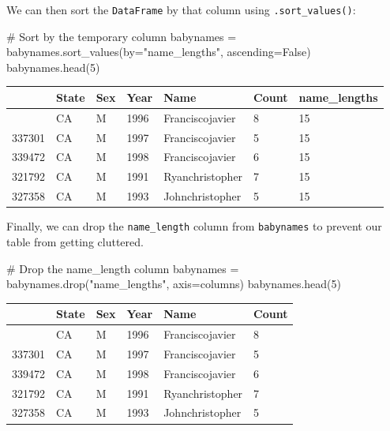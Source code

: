 \documentclass[
  letterpaper,
  DIV=11,
  numbers=noendperiod]{scrreprt}
\newenvironment{Shaded}{\begin{snugshade}}{\end{snugshade}}
\newcommand{\CommentTok}[1]{\textcolor[rgb]{0.37,0.37,0.37}{#1}}
\newcommand{\DecValTok}[1]{\textcolor[rgb]{0.68,0.00,0.00}{#1}}
\newcommand{\NormalTok}[1]{\textcolor[rgb]{0.00,0.23,0.31}{#1}}
\newcommand{\OperatorTok}[1]{\textcolor[rgb]{0.37,0.37,0.37}{#1}}
\newcommand{\StringTok}[1]{\textcolor[rgb]{0.13,0.47,0.30}{#1}}
\newcommand{\VariableTok}[1]{\textcolor[rgb]{0.07,0.07,0.07}{#1}}
\begin{document}
We can then sort the \texttt{DataFrame} by that column using
\texttt{.sort\_values()}:

\begin{Shaded}
\begin{Highlighting}[]
\CommentTok{\# Sort by the temporary column}
\NormalTok{babynames }\OperatorTok{=}\NormalTok{ babynames.sort\_values(by}\OperatorTok{=}\StringTok{"name\_lengths"}\NormalTok{, ascending}\OperatorTok{=}\VariableTok{False}\NormalTok{)}
\NormalTok{babynames.head(}\DecValTok{5}\NormalTok{)}
\end{Highlighting}
\end{Shaded}

\begin{longtable}[]{@{}lllllll@{}}
\toprule\noalign{}
& State & Sex & Year & Name & Count & name\_lengths \\
\midrule\noalign{}
\endhead
\bottomrule\noalign{}
\endlastfoot
334166 & CA & M & 1996 & Franciscojavier & 8 & 15 \\
337301 & CA & M & 1997 & Franciscojavier & 5 & 15 \\
339472 & CA & M & 1998 & Franciscojavier & 6 & 15 \\
321792 & CA & M & 1991 & Ryanchristopher & 7 & 15 \\
327358 & CA & M & 1993 & Johnchristopher & 5 & 15 \\
\end{longtable}

Finally, we can drop the \texttt{name\_length} column from
\texttt{babynames} to prevent our table from getting cluttered.

\begin{Shaded}
\begin{Highlighting}[]
\CommentTok{\# Drop the \textquotesingle{}name\_length\textquotesingle{} column}
\NormalTok{babynames }\OperatorTok{=}\NormalTok{ babynames.drop(}\StringTok{"name\_lengths"}\NormalTok{, axis}\OperatorTok{=}\StringTok{\textquotesingle{}columns\textquotesingle{}}\NormalTok{)}
\NormalTok{babynames.head(}\DecValTok{5}\NormalTok{)}
\end{Highlighting}
\end{Shaded}

\begin{longtable}[]{@{}llllll@{}}
\toprule\noalign{}
& State & Sex & Year & Name & Count \\
\midrule\noalign{}
\endhead
\bottomrule\noalign{}
\endlastfoot
334166 & CA & M & 1996 & Franciscojavier & 8 \\
337301 & CA & M & 1997 & Franciscojavier & 5 \\
339472 & CA & M & 1998 & Franciscojavier & 6 \\
321792 & CA & M & 1991 & Ryanchristopher & 7 \\
327358 & CA & M & 1993 & Johnchristopher & 5 \\
\end{longtable}
\end{document}
